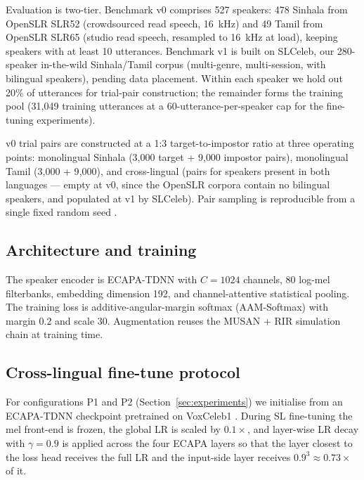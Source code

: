 \documentclass[11pt,a4paper]{article}
\begin{document}
Evaluation is two-tier. Benchmark v0 comprises 527 speakers: 478
Sinhala from OpenSLR SLR52 (crowdsourced read speech, 16~kHz) and 49
Tamil from OpenSLR SLR65 (studio read speech, resampled to 16~kHz at
load), keeping speakers with at least 10 utterances. Benchmark v1 is
built on SLCeleb, our 280-speaker in-the-wild Sinhala/Tamil corpus
(multi-genre, multi-session, with bilingual speakers), pending data
placement. Within each speaker we hold out 20\% of utterances for
trial-pair construction; the remainder forms the training pool
(31{,}049 training utterances at a 60-utterance-per-speaker cap for
the fine-tuning experiments).

v0 trial pairs are constructed at a 1:3 target-to-impostor ratio at
three operating points: monolingual Sinhala (3{,}000 target +
9{,}000 impostor pairs), monolingual Tamil (3{,}000 + 9{,}000), and
cross-lingual (pairs for speakers present in both languages --- empty
at v0, since the OpenSLR corpora contain no bilingual speakers, and
populated at v1 by SLCeleb). Pair sampling is reproducible
from a single fixed random seed \cite{slspv2026repo}.

\subsection{Architecture and training}
\label{sec:method:arch}

The speaker encoder is ECAPA-TDNN \cite{desplanques2020ecapa} with
$C=1024$ channels, 80 log-mel filterbanks, embedding dimension 192,
and channel-attentive statistical pooling. The training loss is
additive-angular-margin softmax (AAM-Softmax) \cite{deng2019arcface}
with margin 0.2 and scale 30. Augmentation reuses the MUSAN +
RIR simulation chain at training time.

\subsection{Cross-lingual fine-tune protocol}
\label{sec:method:finetune}

For configurations P1 and P2 (Section~\ref{sec:experiments}) we
initialise from an ECAPA-TDNN checkpoint pretrained on VoxCeleb1
\cite{nagrani2017voxceleb}. During SL fine-tuning the mel front-end
is frozen, the global LR is scaled by $0.1\times$, and layer-wise
LR decay with $\gamma=0.9$ is applied across the four ECAPA layers
so that the layer closest to the loss head receives the full LR and
the input-side layer receives $0.9^3 \approx 0.73\times$ of it.
\end{document}
